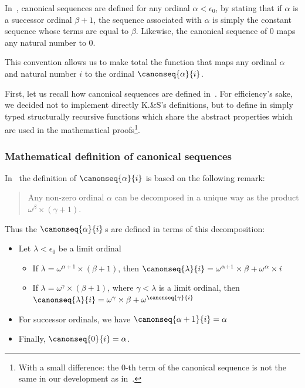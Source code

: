 \begin{remark}
  In~\cite{KS81}, canonical sequences are defined for any ordinal $\alpha <\epsilon_0$,
by stating that if $\alpha$ is a successor ordinal $\beta+1$,  the sequence associated with 
$\alpha$ is simply the constant sequence whose terms are equal to $\beta$.
Likewise, the canonical sequence of $0$ maps any natural number to $0$.

This convention allows us to make total the function that maps any ordinal $\alpha$ and natural number $i$ to the ordinal $\canonseq{\alpha}{i}$.

\end{remark}


First, let us recall how canonical sequences are defined in~\cite{KS81}. For efficiency's sake, we decided not to implement directly K.\&S's definitions, but to define in \gallina{} simply typed structurally recursive functions which share the abstract properties which are used in the mathematical proofs\footnote{With a small difference: the $0$-th term of the canonical sequence is not the same in our development as in~\cite{KS81}.}.





\subsubsection{Mathematical definition of canonical sequences} 

In~\cite{KS81} the definition of $\canonseq{\alpha}{i}$ is based on the following remark:
\begin{quote}
Any non-zero ordinal $\alpha$ can be decomposed in a unique way as the product
$\omega^\beta\times (\gamma+1)$.
\end{quote}

Thus the $\canonseq{\alpha}{i}$\,s are defined in terms of this decomposition:
\begin{definition}
\label{def:canonseq-math}
  
\end{definition}
\begin{mathframe}
  \begin{itemize}
\item Let $\lambda<\epsilon_0$ be a limit ordinal 

\begin{itemize}
\item If $\lambda=\omega^{\alpha+1}\times (\beta+1)$, then 
$\canonseq{\lambda}{i}= \omega^{\alpha+1}\times\beta +  \omega^\alpha \times i$
\item If $\lambda=\omega^{\gamma}\times (\beta+1)$, where $\gamma<\lambda$ is a limit ordinal, then 
$\canonseq{\lambda}{i}=\omega^{\gamma}\times \beta + \omega^{\canonseq{\gamma}{i}}$
\end{itemize}

\item For successor ordinals, we have $\canonseq{\alpha+1}{i}= \alpha$ 

\item Finally, $\canonseq{0}{i}= \alpha$.
\end{itemize}
\end{mathframe}

